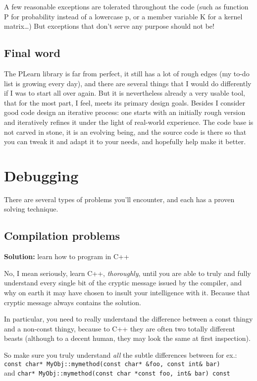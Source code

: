 \documentclass[11pt]{book}
\begin{document}
 A few reasonable exceptions are tolerated throughout the code (such as
function P for probability instead of a lowercase p, or a member
variable K for a kernel matrix\ldots) But exceptions that don't serve
any purpose should not be!

\section{Final word}

 The PLearn library is far from perfect, it still has a lot of
rough edges (my to-do list is growing every day), and there are
several things that I would do differently if I was to start all
over again. But it is nevertheless already a very usable tool, that
for the most part, I feel, meets its primary design goals. Besides I
consider good code design an iterative process: one starts with an
initially rough version and iteratively refines it under the light
of real-world experience. The code base is not carved in stone, it
is an evolving being, and the source code is there so that you can
tweak it and adapt it to your needs, and hopefully help make it better.

\chapter{Debugging}

 There are several types of problems you'll encounter, and each has a
proven solving technique.

\section{Compilation problems}

{\bf Solution: } learn how to program in C++

 No, I mean seriously, learn C++, {\em thoroughly}, until you are
able to truly and fully understand every single bit of the cryptic
message issued by the compiler, and why on earth it may have chosen
to insult your intelligence with it. Because that cryptic message
always contains the solution.

 In particular, you need to really understand the difference between
a const thingy and a non-const thingy, because to C++ they are often
two totally different beasts (although to a decent human, they may
look the same at first inspection).

 So make sure you truly understand {\em all} the subtle differences
between for ex.: \\
\verb!const char* MyObj::mymethod(const char* &foo, const int& bar)!  \\
and
\verb!char* MyObj::mymethod(const char *const foo, int& bar) const! \\
\end{document}
